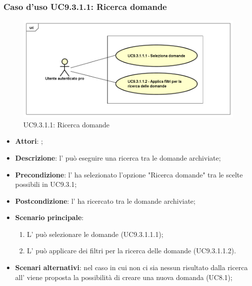 		 \subsubsection{Caso d'uso UC9.3.1.1: Ricerca domande}
		 \label{UC9.3.1.1}
		 \begin{figure}[h]
		 	\centering
		 	\includegraphics[scale=0.5,keepaspectratio]{UML/UC9_3_1_1.png}
		 	\caption{UC9.3.1.1: Ricerca domande}
		 \end{figure}
		 \FloatBarrier
		 \begin{itemize}
		 	\item \textbf{Attori}: \uaupro{};
		 	\item \textbf{Descrizione}: l'\uaupro{} può eseguire una ricerca tra le domande archiviate; 
		 	\item \textbf{Precondizione}: l'\uaupro{} ha selezionato l'opzione "Ricerca domande" tra le scelte possibili in UC9.3.1;
		 	\item \textbf{Postcondizione}: l'\uaupro{} ha ricercato tra le domande archiviate;
		 	\item \textbf{Scenario principale}:
		 	\begin{enumerate}
		 		\item L'\uaupro{} può selezionare le domande (UC9.3.1.1.1); 
		 		\item L'\uaupro{} può applicare dei filtri per la ricerca delle domande (UC9.3.1.1.2).
		 	\end{enumerate}
		 	\item \textbf{Scenari alternativi}: nel caso in cui non ci sia nessun risultato dalla ricerca all'\uaupro{} viene proposta la possibilità di creare una nuova domanda (UC8.1);
		 \end{itemize}
		 
